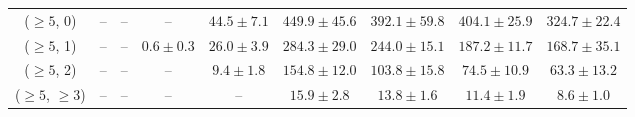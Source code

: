 \begin{table}[h!]
{\begin{tabular}{ccccccccc}
	($\ge5$, 0) & -- & -- & -- & $44.5\pm 7.1$ & $449.9\pm 45.6$ & $392.1\pm 59.8$ & $404.1\pm 25.9$ & $324.7\pm 22.4$ \\[0.5ex] 
	($\ge5$, 1) & -- & -- & $0.6\pm 0.3$ & $26.0\pm 3.9$ & $284.3\pm 29.0$ & $244.0\pm 15.1$ & $187.2\pm 11.7$ & $168.7\pm 35.1$ \\[0.5ex] 
	($\ge5$, 2) & -- & -- & -- & $9.4\pm 1.8$ & $154.8\pm 12.0$ & $103.8\pm 15.8$ & $74.5\pm 10.9$ & $63.3\pm 13.2$ \\[0.5ex] 
	($\ge5$, $\ge3$) & -- & -- & -- & -- & $15.9\pm 2.8$ & $13.8\pm 1.6$ & $11.4\pm 1.9$ & $8.6\pm 1.0$ \\[0.5ex] 
	\hline
	\hline
\end{tabular}}
\end{table}

